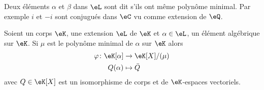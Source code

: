 \begin{definition}
    Deux éléments \( \alpha\) et \( \beta\) dans \( \eL\) sont dit  s'ils ont même polynôme minimal. Par exemple \( i\) et \( -i\) sont conjugués dans \( \eC\) vu comme extension de \( \eQ\).
\end{definition}

\begin{lemma}       \label{LEMooHKTMooKEoOuK}
    Soient un corps \( \eK\), une extension \( \eL\) de \( \eK\) et \( \alpha\in \eL\), un élément algébrique sur \( \eK\). Si \( \mu\) est le polynôme minimal de \( \alpha\) sur \( \eK\) alors
    \begin{equation}
        \begin{aligned}
            \varphi\colon \eK[\alpha]&\to \eK[X]/(\mu) \\
            Q(\alpha)&\mapsto \bar Q
        \end{aligned}
    \end{equation}
    avec \( Q\in\eK[X]\) est un isomorphisme de corps et de \( \eK\)-espaces vectoriels.
\end{lemma}

